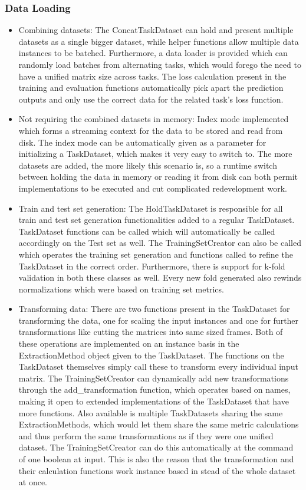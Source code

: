 \subsubsection{Data Loading}
\begin{itemize}
	\item Combining datasets: The ConcatTaskDataset can hold and present multiple datasets as a single bigger dataset, while helper functions allow multiple data instances to be batched. Furthermore, a data loader is provided which can randomly load batches from alternating tasks, which would forego the need to have a unified matrix size across tasks. The loss calculation present in the training and evaluation functions automatically pick apart the prediction outputs and only use the correct data for the related task's loss function. 
	\item Not requiring the combined datasets in memory:  Index mode implemented which forms a streaming context for the data to be stored and read from disk. The index mode can be automatically given as a parameter for initializing a TaskDataset, which makes it very easy to switch to. The more datasets are added, the more likely this scenario is, so a runtime switch between holding the data in memory or reading it from disk can both permit implementations to be executed and cut complicated redevelopment work.
	\item Train and test set generation: The HoldTaskDataset is responsible for all train and test set generation functionalities added to a regular TaskDataset. TaskDataset functions can be called which will automatically be called accordingly on the Test set as well. The TrainingSetCreator can also be called which operates the training set generation and functions called to refine the TaskDataset in the correct order. Furthermore, there is support for k-fold validation in both these classes as well. Every new fold generated also rewinds normalizations which were based on training set metrics.
	\item Transforming data: There are two functions present in the TaskDataset for transforming the data, one for scaling the input instances and one for further transformations like cutting the matrices into same sized frames. Both of these operations are implemented on an instance basis in the ExtractionMethod object given to the TaskDataset. The functions on the TaskDataset themselves simply call these to transform every individual input matrix. The TrainingSetCreator can dynamically add new transformations through the add\_transformation function, which operates based on names, making it open to extended implementations of the TaskDataset that have more functions. Also available is multiple TaskDatasets sharing the same ExtractionMethods, which would let them share the same metric calculations and thus perform the same transformations as if they were one unified dataset. The TrainingSetCreator can do this automatically at the command of one boolean at input. This is also the reason that the transformation and their calculation functions work instance based in stead of the whole dataset at once.

\end{itemize}

